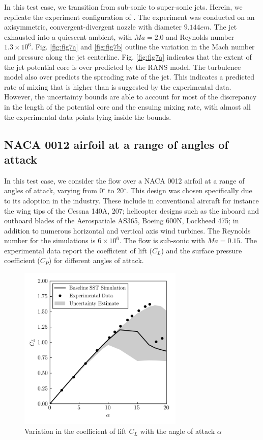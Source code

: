 In this test case, we transition from sub-sonic to super-sonic jets. Herein, we replicate the experiment configuration of \cite{seiner}. The experiment was conducted on an axisymmetric, convergent-divergent nozzle with diameter $9.144 cm$. The jet exhausted into a quiescent ambient, with  $Ma=2.0$ and Reynolds number $1.3 \times 10^6$. Fig. \ref{fig:fig7a} and \ref{fig:fig7b} outline the variation in the Mach number and pressure along the jet centerline. Fig. \ref{fig:fig7a} indicates that the extent of the jet potential core is over predicted by the RANS model. The turbulence model also over predicts the spreading rate of the jet. This indicates a predicted rate of mixing that is higher than is suggested by the experimental data. However, the uncertainty bounds are able to account for most of the discrepancy in the length of the potential core and the ensuing mixing rate, with almost all the experimental data points lying inside the bounds. 

\subsection{NACA 0012 airfoil at a range of angles of attack}
In this test case, we consider the flow over a NACA 0012 airfoil at a range of angles of attack, varying from 0$^{\circ}$ to 20$^{\circ}$. This design was chosen specifically due to its adoption in the industry. These include in conventional aircraft for instance the wing tips of the Cessna 140A, 207; helicopter designs such as the inboard and outboard blades of the Aerospatiale AS365, Boeing 600N, Lockheed 475; in addition to numerous horizontal and vertical axis wind turbines. The Reynolds number for the simulations is $6\times 10^6$. The flow is sub-sonic with $Ma=0.15$. The experimental data \cite{ladson1988} report the coefficient of lift ($C_L$) and the surface pressure coefficient ($C_P$) for different angles of attack. 

\begin{figure}
\center
\includegraphics[width=0.7\textwidth]{suthesis/images/L6_ls_cl_vs_alpha_uq.png}
\caption{Variation in the coefficient of lift $C_L$ with the angle of attack $\alpha$\label{fig:naca0012_cl_vs_alpha}}
\end{figure}

